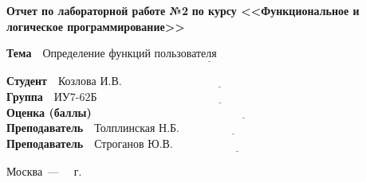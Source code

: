 \begin{titlepage}
	
	\begin{center}
		\Large\textbf{Отчет по лабораторной работе №2}
		\Large\textbf{по курсу <<Функциональное и логическое программирование>>}
	\end{center}


	\noindent\textbf{Тема} $\underline{\text{~~Определение функций пользователя~~~~~~~~~~~~~~~~~~~~~~~~~~~~~~~~~~~~~~~~~~~~~}}$\newline\newline\newline


	\noindent\textbf{Студент} $\underline{\text{~~Козлова И.В.~~~~~~~~~~~~~~~~~~~~~~~~~~~~~~~~~~~~~~~~~~~~~~~~~~~~~~~~~~~~~~~~~~~~~~~~}}$\newline\newline
	\noindent\textbf{Группа} $\underline{\text{~~ИУ7-62Б~~~~~~~~~~~~~~~~~~~~~~~~~~~~~~~~~~~~~~~~~~~~~~~~~~~~~~~~~~~~~~~~~~~~~~~~~~~~~~~~}}$\newline\newline
	\noindent\textbf{Оценка (баллы)} $\underline{\text{~~~~~~~~~~~~~~~~~~~~~~~~~~~~~~~~~~~~~~~~~~~~~~~~~~~~~~~~~~~~~~~~~~~~~~~~~~~~~~~~}}$\newline\newline
	\noindent\textbf{Преподаватель} $\underline{\text{~~Толплинская Н.Б.~~~~~~~~~~~~~~~~~~~~~~~~~~~~~~~~~~~~~~~~~~~~~~~~~~~~~~}}$\newline\newline
	\noindent\textbf{Преподаватель} $\underline{\text{~~Строганов Ю.В.~~~~~~~~~~~~~~~~~~~~~~~~~~~~~~~~~~~~~~~~~~~~~~~~~~~~~~~~~~}}$\newline
	
	\begin{center}
		\vfill
		Москва~---~\the\year
		~г.
	\end{center}
	\restoregeometry
\end{titlepage}

